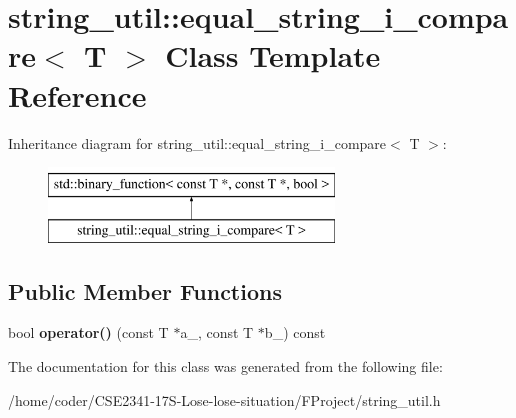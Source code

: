 \section{string\+\_\+util\+:\+:equal\+\_\+string\+\_\+i\+\_\+compare$<$ T $>$ Class Template Reference}
\label{classstring__util_1_1equal__string__i__compare}
Inheritance diagram for string\+\_\+util\+:\+:equal\+\_\+string\+\_\+i\+\_\+compare$<$ T $>$\+:\begin{figure}[H]
\begin{center}
\leavevmode
\includegraphics[height=2.000000cm]{classstring__util_1_1equal__string__i__compare}
\end{center}
\end{figure}
\subsection*{Public Member Functions}
\begin{DoxyCompactItemize}
\item 
bool {\bfseries operator()} (const T $\ast$a\+\_\+, const T $\ast$b\+\_\+) const \label{classstring__util_1_1equal__string__i__compare_af8c94159bbb8903c7cf7b71941a7d2bc}

\end{DoxyCompactItemize}


The documentation for this class was generated from the following file\+:\begin{DoxyCompactItemize}
\item 
/home/coder/\+C\+S\+E2341-\/17\+S-\/\+Lose-\/lose-\/situation/\+F\+Project/string\+\_\+util.\+h\end{DoxyCompactItemize}

